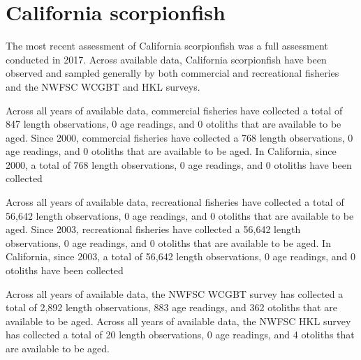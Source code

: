 \documentclass[11pt,
  english,
  letterpaper,
]{article}
\begin{document}

\hypertarget{california-scorpionfish}{%
\section{California scorpionfish}\label{california-scorpionfish}}

\leavevmode\tagmcend\tagstructend


The most recent assessment of California scorpionfish was a full assessment conducted in 2017. Across available data, California scorpionfish have been observed and sampled generally by both commercial and recreational fisheries and the NWFSC WCGBT and HKL surveys.

\leavevmode\tagmcend\tagstructend\par


Across all years of available data, commercial fisheries have collected a total of 847 length observations, 0 age readings, and 0 otoliths that are available to be aged. Since 2000, commercial fisheries have collected a 768 length observations, 0 age readings, and 0 otoliths that are available to be aged. In California, since 2000, a total of 768 length observations, 0 age readings, and 0 otoliths have been collected

\leavevmode\tagmcend\tagstructend\par


Across all years of available data, recreational fisheries have collected a total of 56,642 length observations, 0 age readings, and 0 otoliths that are available to be aged. Since 2003, recreational fisheries have collected a 56,642 length observations, 0 age readings, and 0 otoliths that are available to be aged. In California, since 2003, a total of 56,642 length observations, 0 age readings, and 0 otoliths have been collected

\leavevmode\tagmcend\tagstructend\par


Across all years of available data, the NWFSC WCGBT survey has collected a total of 2,892 length observations, 883 age readings, and 362 otoliths that are available to be aged. Across all years of available data, the NWFSC HKL survey has collected a total of 20 length observations, 0 age readings, and 4 otoliths that are available to be aged.
\end{document}
